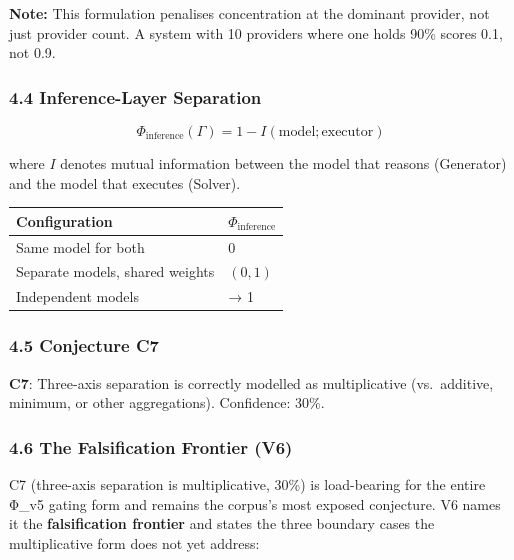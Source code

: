 \documentclass[
  11pt,
]{article}
\newcounter{none} %
\begin{document}
\textbf{Note:} This formulation penalises concentration at the dominant
provider, not just provider count. A system with 10 providers where one
holds 90\% scores 0.1, not 0.9.

\subsubsection{4.4 Inference-Layer
Separation}\label{inference-layer-separation}

\[\Phi_{\text{inference}}(\Gamma) = 1 - I(\text{model} ; \text{executor})\]

where \(I\) denotes mutual information between the model that reasons
(Generator) and the model that executes (Solver).

{\def\LTcaptype{none} %
\begin{longtable}[]{@{}ll@{}}
\toprule\noalign{}
Configuration & \(\Phi_{\text{inference}}\) \\
\midrule\noalign{}
\endhead
\bottomrule\noalign{}
\endlastfoot
Same model for both & 0 \\
Separate models, shared weights & \((0, 1)\) \\
Independent models & → 1 \\
\end{longtable}
}

\subsubsection{4.5 Conjecture C7}\label{conjecture-c7}

\textbf{C7}: Three-axis separation is correctly modelled as
multiplicative (vs.~additive, minimum, or other aggregations).
Confidence: 30\%.

\subsubsection{4.6 The Falsification Frontier
(V6)}\label{the-falsification-frontier-v6}

C7 (three-axis separation is multiplicative, 30\%) is load-bearing for
the entire Φ\_v5 gating form and remains the corpus's most exposed
conjecture. V6 names it the \textbf{falsification frontier} and states
the three boundary cases the multiplicative form does not yet address:
\end{document}
